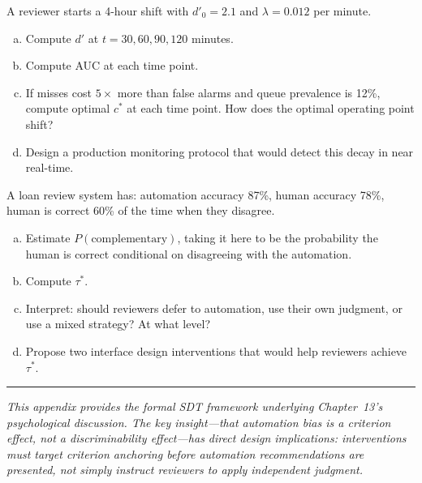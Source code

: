 \begin{Exercise}
A reviewer starts a 4-hour shift with $d'_0 = 2.1$ and $\lambda = 0.012$ per minute.
\begin{enumerate}[(a)]
    \item Compute $d'$ at $t = 30, 60, 90, 120$ minutes.
    \item Compute AUC at each time point.
    \item If misses cost $5\times$ more than false alarms and queue prevalence is 12\%, compute optimal $c^*$ at each time point. How does the optimal operating point shift?
    \item Design a production monitoring protocol that would detect this decay in near real-time.
\end{enumerate}
\end{Exercise}

\begin{Exercise}
A loan review system has: automation accuracy 87\%, human accuracy 78\%, human is correct 60\% of the time when they disagree.
\begin{enumerate}[(a)]
    \item Estimate $P(\text{complementary})$, taking it here to be the probability the human is correct conditional on disagreeing with the automation.
    \item Compute $\tau^*$.
    \item Interpret: should reviewers defer to automation, use their own judgment, or use a mixed strategy? At what level?
    \item Propose two interface design interventions that would help reviewers achieve $\tau^*$.
\end{enumerate}
\end{Exercise}

\bigskip
\begin{center}
\rule{0.5\textwidth}{0.4pt}
\end{center}
\bigskip

\noindent\textit{This appendix provides the formal SDT framework underlying Chapter~13's psychological discussion. The key insight---that automation bias is a criterion effect, not a discriminability effect---has direct design implications: interventions must target criterion anchoring before automation recommendations are presented, not simply instruct reviewers to apply independent judgment.}
\apxnumoff
